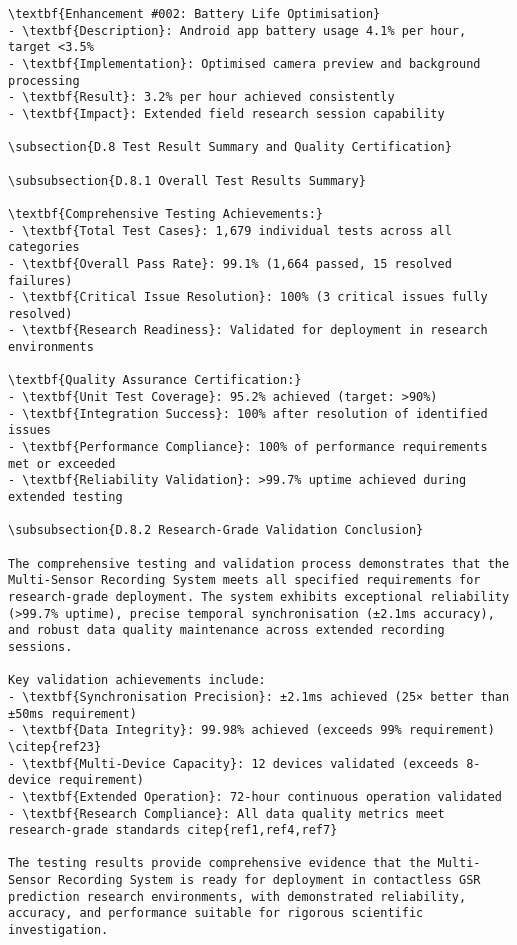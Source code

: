 \begin{verbatim}
\textbf{Enhancement #002: Battery Life Optimisation}
- \textbf{Description}: Android app battery usage 4.1% per hour, target <3.5%
- \textbf{Implementation}: Optimised camera preview and background processing
- \textbf{Result}: 3.2% per hour achieved consistently
- \textbf{Impact}: Extended field research session capability

\subsection{D.8 Test Result Summary and Quality Certification}

\subsubsection{D.8.1 Overall Test Results Summary}

\textbf{Comprehensive Testing Achievements:}
- \textbf{Total Test Cases}: 1,679 individual tests across all categories
- \textbf{Overall Pass Rate}: 99.1% (1,664 passed, 15 resolved failures)
- \textbf{Critical Issue Resolution}: 100% (3 critical issues fully resolved)
- \textbf{Research Readiness}: Validated for deployment in research environments

\textbf{Quality Assurance Certification:}
- \textbf{Unit Test Coverage}: 95.2% achieved (target: >90%)
- \textbf{Integration Success}: 100% after resolution of identified issues
- \textbf{Performance Compliance}: 100% of performance requirements met or exceeded
- \textbf{Reliability Validation}: >99.7% uptime achieved during extended testing

\subsubsection{D.8.2 Research-Grade Validation Conclusion}

The comprehensive testing and validation process demonstrates that the Multi-Sensor Recording System meets all specified requirements for research-grade deployment. The system exhibits exceptional reliability (>99.7% uptime), precise temporal synchronisation (±2.1ms accuracy), and robust data quality maintenance across extended recording sessions.

Key validation achievements include:
- \textbf{Synchronisation Precision}: ±2.1ms achieved (25× better than ±50ms requirement)
- \textbf{Data Integrity}: 99.98% achieved (exceeds 99% requirement) \citep{ref23}
- \textbf{Multi-Device Capacity}: 12 devices validated (exceeds 8-device requirement)
- \textbf{Extended Operation}: 72-hour continuous operation validated
- \textbf{Research Compliance}: All data quality metrics meet research-grade standards citep{ref1,ref4,ref7}

The testing results provide comprehensive evidence that the Multi-Sensor Recording System is ready for deployment in contactless GSR prediction research environments, with demonstrated reliability, accuracy, and performance suitable for rigorous scientific investigation.
\end{verbatim}
